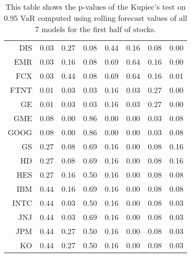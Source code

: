 \begin{table}[ht]
\begin{tabular}{rrrrrrrr}
  DIS & 0.03 & 0.27 & 0.08 & 0.44 & 0.16 & 0.08 & 0.00 \\ 
  EMR & 0.03 & 0.16 & 0.08 & 0.69 & 0.64 & 0.16 & 0.00 \\ 
  FCX & 0.03 & 0.44 & 0.08 & 0.69 & 0.64 & 0.16 & 0.01 \\ 
  FTNT & 0.01 & 0.03 & 0.03 & 0.16 & 0.03 & 0.27 & 0.00 \\ 
  GE & 0.01 & 0.03 & 0.03 & 0.16 & 0.03 & 0.27 & 0.00 \\ 
  GME & 0.08 & 0.00 & 0.86 & 0.00 & 0.00 & 0.03 & 0.08 \\ 
  GOOG & 0.08 & 0.00 & 0.86 & 0.00 & 0.00 & 0.03 & 0.08 \\ 
  GS & 0.27 & 0.08 & 0.69 & 0.16 & 0.00 & 0.08 & 0.16 \\ 
  HD & 0.27 & 0.08 & 0.69 & 0.16 & 0.00 & 0.08 & 0.16 \\ 
  HES & 0.27 & 0.16 & 0.50 & 0.16 & 0.00 & 0.08 & 0.08 \\ 
  IBM & 0.44 & 0.16 & 0.69 & 0.16 & 0.00 & 0.08 & 0.08 \\ 
  INTC & 0.44 & 0.03 & 0.50 & 0.16 & 0.00 & 0.08 & 0.03 \\ 
  JNJ & 0.44 & 0.03 & 0.69 & 0.16 & 0.00 & 0.08 & 0.03 \\ 
  JPM & 0.44 & 0.27 & 0.50 & 0.16 & 0.00 & 0.08 & 0.03 \\ 
  KO & 0.44 & 0.27 & 0.50 & 0.16 & 0.00 & 0.08 & 0.03 \\ 
   \hline
\end{tabular}
\caption[Kupiec's test p-values, alpha =0.95 (1)]{This table shows the p-values of the Kupiec's test on 0.95 VaR computed using rolling forecast values of all 7 models for the first half of stocks.} 
\label{Table:Kupiec_test_rolling_0.95_1}
\end{table}
